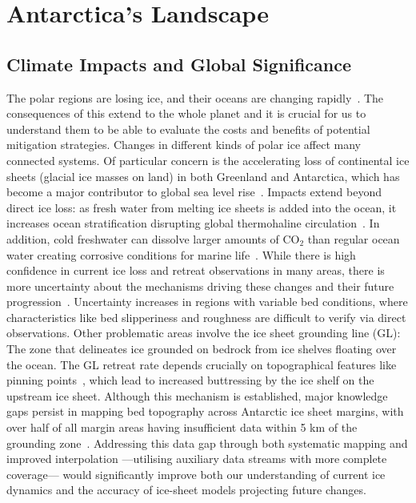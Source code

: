 \chapter{Antarctica's Landscape}\label{why}
\section{Climate Impacts and Global Significance}
The polar regions are losing ice, and their oceans are changing rapidly~\cite{O_C_in_changingClimate}. The consequences of this extend to the whole planet and it is crucial for us to understand them to be able to evaluate the costs and benefits of potential mitigation strategies. 
Changes in different kinds of polar ice affect many connected systems. Of particular concern is the accelerating loss of continental ice sheets (glacial ice masses on land) in both Greenland and Antarctica, which has become a major contributor to global sea level rise~\cite{O_C_in_changingClimate}. Impacts extend beyond direct ice loss: as fresh water from melting ice sheets is added into the ocean, it increases ocean stratification disrupting global thermohaline circulation~\cite{Jacobs_2004}. In addition, cold freshwater can dissolve larger amounts of $\mathrm{CO_2}$ than regular ocean water creating corrosive conditions for marine life~\cite{O_C_in_changingClimate}.
While there is high confidence in current ice loss and retreat observations in many areas, there is more uncertainty about the mechanisms driving these changes and their future progression~\cite{Fox-Kemper_2021}. Uncertainty increases in regions with variable bed conditions, where characteristics like bed slipperiness and roughness are difficult to verify via direct observations. Other problematic areas involve the ice sheet grounding line (GL): The zone that delineates ice grounded on bedrock from ice shelves floating over the ocean. The GL retreat rate depends crucially on topographical features like pinning points~\cite{Fox-Kemper_2021}, which lead to increased buttressing by the ice shelf on the upstream ice sheet. Although this mechanism is established, major knowledge gaps persist in mapping bed topography across Antarctic ice sheet margins, with over half of all margin areas having insufficient data within 5 km of the grounding zone~\cite{RINGS_2022}. Addressing this data gap through both systematic mapping and improved interpolation —utilising auxiliary data streams with more complete coverage— would significantly improve both our understanding of current ice dynamics and the accuracy of ice-sheet models projecting future changes.

